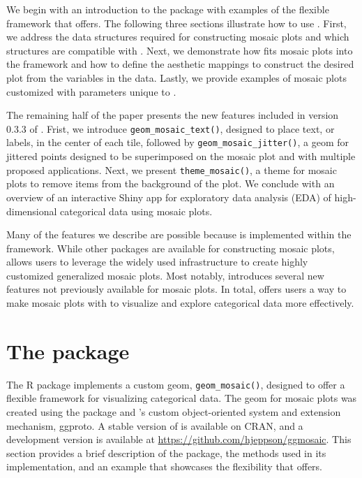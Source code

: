 We begin with an introduction to the package with examples of the flexible framework that  offers. The following three sections illustrate how to use . First, we address the data structures required for constructing mosaic plots and which structures are compatible with . Next, we demonstrate how  fits mosaic plots into the  framework and how to define the aesthetic mappings to construct the desired plot from the variables in the data. Lastly, we provide examples of mosaic plots customized with parameters unique to .

The remaining half of the paper presents the new features included in version 0.3.3 of . Frist, we introduce \texttt{geom\_mosaic\_text()}, designed to place text, or labels, in the center of each tile, followed by \texttt{geom\_mosaic\_jitter()}, a geom for jittered points designed to be superimposed on the mosaic plot and with multiple proposed applications. Next, we present \texttt{theme\_mosaic()}, a theme for mosaic plots to remove items from the background of the plot. We conclude with an overview of an interactive Shiny app for exploratory data analysis (EDA) of high-dimensional categorical data using mosaic plots.

Many of the features we describe are possible because  is implemented within the  framework. While other packages are available for constructing mosaic plots,  allows users to leverage the widely used  infrastructure to create highly customized generalized mosaic plots. Most notably,  introduces several new features not previously available for mosaic plots. In total,  offers users a way to make mosaic plots with  to visualize and explore categorical data more effectively.

\hypertarget{the-package}{%
\section{\texorpdfstring{The  package}{The  package}}\label{the-package}}

The R package  implements a custom  geom, \texttt{geom\_mosaic()}, designed to offer a flexible framework for visualizing categorical data. The geom for mosaic plots was created using the  package and 's custom object-oriented system and extension mechanism, ggproto. A stable version of  is available on CRAN, and a development version is available at \url{https://github.com/hjeppson/ggmosaic}. This section provides a brief description of the package, the methods used in its implementation, and an example that showcases the flexibility that  offers.

